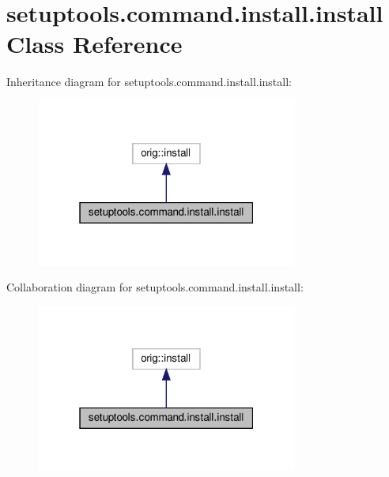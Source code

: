 \hypertarget{classsetuptools_1_1command_1_1install_1_1install}{}\section{setuptools.\+command.\+install.\+install Class Reference}
\label{classsetuptools_1_1command_1_1install_1_1install}


Inheritance diagram for setuptools.\+command.\+install.\+install\+:
\nopagebreak
\begin{figure}[H]
\begin{center}
\leavevmode
\includegraphics[width=244pt]{classsetuptools_1_1command_1_1install_1_1install__inherit__graph}
\end{center}
\end{figure}


Collaboration diagram for setuptools.\+command.\+install.\+install\+:
\nopagebreak
\begin{figure}[H]
\begin{center}
\leavevmode
\includegraphics[width=244pt]{classsetuptools_1_1command_1_1install_1_1install__coll__graph}
\end{center}
\end{figure}
